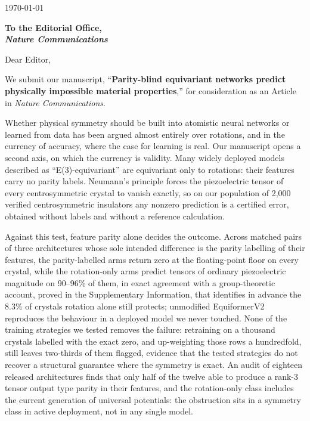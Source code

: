 \documentclass[11pt]{article}
\begin{document}
\begin{flushright}
\today
\end{flushright}

\textbf{To the Editorial Office, \\ \textit{Nature Communications}}

Dear Editor,

We submit our manuscript, ``\textbf{Parity-blind equivariant networks predict physically impossible material properties},'' for consideration as an Article in \textit{Nature Communications}.

Whether physical symmetry should be built into atomistic neural networks or learned from data has been argued almost entirely over rotations, and in the currency of accuracy, where the case for learning is real. Our manuscript opens a second axis, on which the currency is validity. Many widely deployed models described as ``E(3)-equivariant'' are equivariant only to rotations: their features carry no parity labels. Neumann's principle forces the piezoelectric tensor of every centrosymmetric crystal to vanish exactly, so on our population of 2,000 verified centrosymmetric insulators any nonzero prediction is a certified error, obtained without labels and without a reference calculation.

Against this test, feature parity alone decides the outcome. Across matched pairs of three architectures whose sole intended difference is the parity labelling of their features, the parity-labelled arms return zero at the floating-point floor on every crystal, while the rotation-only arms predict tensors of ordinary piezoelectric magnitude on 90--96\% of them, in exact agreement with a group-theoretic account, proved in the Supplementary Information, that identifies in advance the 8.3\% of crystals rotation alone still protects; unmodified EquiformerV2 reproduces the behaviour in a deployed model we never touched. None of the training strategies we tested removes the failure: retraining on a thousand crystals labelled with the exact zero, and up-weighting those rows a hundredfold, still leaves two-thirds of them flagged, evidence that the tested strategies do not recover a structural guarantee where the symmetry is exact. An audit of eighteen released architectures finds that only half of the twelve able to produce a rank-3 tensor output type parity in their features, and the rotation-only class includes the current generation of universal potentials: the obstruction sits in a symmetry class in active deployment, not in any single model.
\end{document}
